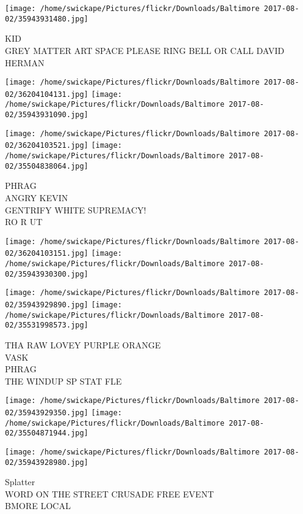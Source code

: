 \documentclass[10pt,letterpaper]{article}
\begin{document}
\vspace{0.25in}
\texttt{[image: /home/swickape/Pictures/flickr/Downloads/Baltimore 2017-08-02/35943931480.jpg]}

KID\\
GREY MATTER ART SPACE PLEASE RING BELL OR CALL DAVID HERMAN\\
\pagebreak

\texttt{[image: /home/swickape/Pictures/flickr/Downloads/Baltimore 2017-08-02/36204104131.jpg]}
\texttt{[image: /home/swickape/Pictures/flickr/Downloads/Baltimore 2017-08-02/35943931090.jpg]}

\texttt{[image: /home/swickape/Pictures/flickr/Downloads/Baltimore 2017-08-02/36204103521.jpg]}
\texttt{[image: /home/swickape/Pictures/flickr/Downloads/Baltimore 2017-08-02/35504838064.jpg]}

PHRAG\\
ANGRY KEVIN\\
GENTRIFY WHITE SUPREMACY!\\
RO R UT\\
\pagebreak

\texttt{[image: /home/swickape/Pictures/flickr/Downloads/Baltimore 2017-08-02/36204103151.jpg]}
\texttt{[image: /home/swickape/Pictures/flickr/Downloads/Baltimore 2017-08-02/35943930300.jpg]}

\texttt{[image: /home/swickape/Pictures/flickr/Downloads/Baltimore 2017-08-02/35943929890.jpg]}
\texttt{[image: /home/swickape/Pictures/flickr/Downloads/Baltimore 2017-08-02/35531998573.jpg]}

THA RAW LOVEY PURPLE ORANGE\\
VASK\\
PHRAG\\
THE WINDUP SP STAT FLE\\
\pagebreak

\texttt{[image: /home/swickape/Pictures/flickr/Downloads/Baltimore 2017-08-02/35943929350.jpg]}
\texttt{[image: /home/swickape/Pictures/flickr/Downloads/Baltimore 2017-08-02/35504871944.jpg]}

\texttt{[image: /home/swickape/Pictures/flickr/Downloads/Baltimore 2017-08-02/35943928980.jpg]}

Splatter\\
WORD ON THE STREET CRUSADE FREE EVENT\\
BMORE LOCAL\\
\pagebreak
\end{document}
